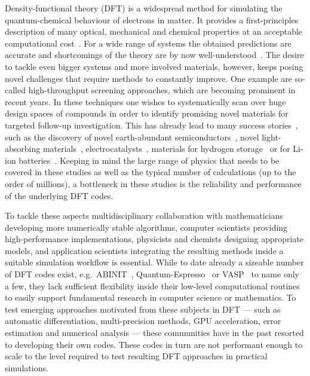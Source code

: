 \documentclass{juliacon}
\begin{document}


\maketitle

Density-functional theory (DFT) is a widespread method for simulating the
quantum-chemical behaviour of electrons in matter.
It provides a first-principles description of
many optical, mechanical and chemical properties
at an acceptable computational cost~\cite{Martin2004,Burke2012,Burke2013}.
For a wide range of systems the obtained predictions are accurate
and shortcomings of the theory are by now well-understood~\cite{Burke2012,Burke2013}.
The desire to tackle even bigger systems and
more involved materials, however, keeps posing novel challenges
that require methods to constantly improve.
One example are so-called high-throughput screening approaches,
which are becoming prominent in recent years.
In these techniques one
wishes to systematically scan over huge design spaces of compounds
in order to identify promising novel materials
for targeted follow-up investigation.
This has already lead to many success stories~\cite{Jain2016},
such as the discovery of
novel earth-abundant semiconductors~\cite{Hinuma2016},
novel light-absorbing materials~\cite{Zhao2017},
electrocatalysts~\cite{Greeley2006},
materials for hydrogen storage~\cite{Hummelshoj2009}
or for Li-ion batteries~\cite{Ahmad2018}.
Keeping in mind the large range of physics that needs
to be covered in these studies as well as
the typical  number of calculations (up to the order of millions),
a bottleneck in these studies
is the reliability and performance
of the underlying DFT codes.
\vskip 6pt

To tackle these aspects
multidisciplinary collaboration with
mathematicians developing more numerically stable algorithms,
computer scientists providing high-performance implementations,
physicists and chemists designing appropriate models,
and application scientists integrating the resulting methods
inside a suitable simulation workflow is essential.
While to date already a sizeable number of DFT codes exist,
e.g.~ABINIT~\cite{Romero2020}, Quantum-Espresso~\cite{Giannozzi2020}
or VASP~\cite{VASP} to name only a few,
they lack sufficient flexibility inside
their low-level computational routines
to easily support fundamental research
in computer science or mathematics.
To test emerging approaches motivated from these subjects in DFT
---
such as automatic differentiation, multi-precision methods,
GPU acceleration, error estimation and numerical analysis
---
these communities have in the past resorted
to developing their own codes.
These codes in turn are not performant enough
to scale to the level required to test
resulting DFT approaches in practical simulations.
\vskip 6pt
\end{document}
